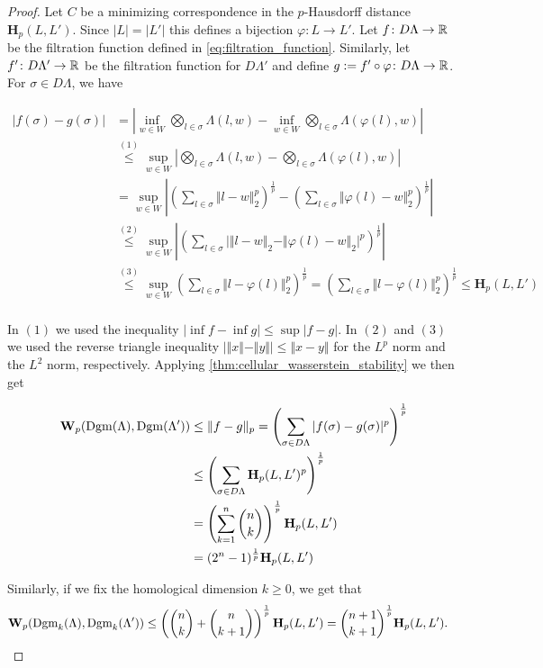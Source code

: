 	\begin{proof}
		Let $C$ be a minimizing correspondence in the $p$-Hausdorff distance $\textbf{H}_p(L,L')$. Since $|L|=|L'|$ this defines a bijection $\varphi\colon L\to L'$. Let $f\colon D\Lambda\to\mathbb{R}$ be the filtration function defined in \cref{eq:filtration_function}. Similarly, let $f'\colon D\Lambda'\to\mathbb{R}$ be the filtration function for $D\Lambda'$ and define $g:=f'\circ\varphi\colon D\Lambda\to\mathbb{R}$. For $\sigma\in D\Lambda$, we have
		
		\begin{align*}
			\vert f(\sigma) - g(\sigma)\vert &= \left\vert \inf_{w\in W}\bigotimes_{l\in\sigma}\Lambda(l,w) - \inf_{w\in W}\bigotimes_{l\in\sigma}\Lambda(\varphi(l),w)\right\vert\\
			&\overset{(1)}\leq\sup_{w\in W}\left\vert\bigotimes_{l\in\sigma}\Lambda(l,w)-\bigotimes_{l\in\sigma}\Lambda(\varphi(l),w)\right\vert\\
			&=\sup_{w\in W}\left\vert \left(\sum_{l\in\sigma}\Vert l-w\Vert_2^p\right)^{\frac{1}{p}} - \left(\sum_{l\in\sigma}\Vert \varphi(l)-w\Vert_2^p\right)^{\frac{1}{p}}\right\vert \\
			&\overset{(2)}\leq\sup_{w\in W}\left\vert \left(\sum_{l\in\sigma}\vert\Vert l-w\Vert_2-\Vert \varphi(l)-w\Vert_2\vert^p \right)^{\frac{1}{p}} \right\vert\\
			&\overset{(3)}\leq\sup_{w\in W}\left(\sum_{l\in\sigma}\Vert l-\varphi(l)\Vert_2^p \right)^{\frac{1}{p}} =\left(\sum_{l\in\sigma}\Vert l-\varphi(l)\Vert_2^p \right)^{\frac{1}{p}}\leq\textbf{H}_p(L,L') \\
		\end{align*}
	
		In $(1)$ we used the inequality $\vert\inf f - \inf g\vert\leq \sup\vert f-g\vert$. In $(2)$ and $(3)$ we used the reverse triangle inequality $\vert\Vert x\Vert-\Vert y\Vert\vert\leq\Vert x-y\Vert$ for the $L^p$ norm and the $L^2$ norm, respectively. Applying \cref{thm:cellular_wasserstein_stability} we then get
		
		\begin{align*}
			\textbf{W}_p(\operatorname{Dgm}(\Lambda), \operatorname{Dgm}(\Lambda'))&\leq \Vert f-g\Vert_p = \left(\sum_{\sigma\in D\Lambda}\vert f(\sigma)-g(\sigma)\vert^p\right)^{\frac{1}{p}}\\
			&\leq\left(\sum_{\sigma\in D\Lambda}\textbf{H}_p(L,L')^p\right)^{\frac{1}{p}}\\
			&= \left(\sum_{k=1}^n\binom{n}{k}\right)^{\frac{1}{p}}\textbf{H}_p(L,L')\\
			&=(2^n-1)^{\frac{1}{p}}\textbf{H}_p(L,L')
		\end{align*}
		
		Similarly, if we fix the homological dimension $k\geq0$, we get that
		\begin{align*}
			\textbf{W}_p(\operatorname{Dgm}_k(\Lambda), \operatorname{Dgm}_k(\Lambda'))&\leq\left(\binom{n}{k}+\binom{n}{k+1}\right)^{\frac{1}{p}}\textbf{H}_p(L,L') = \binom{n+1}{k+1}^{\frac{1}{p}}\textbf{H}_p(L,L').
		\end{align*}
	
	\end{proof}

